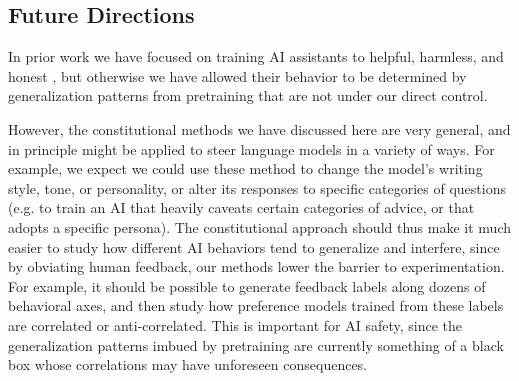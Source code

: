\documentclass[english]{article}
\renewcommand\>{\rangle}
\begin{document}



\subsection{Future Directions}


In prior work we have focused on training AI assistants to helpful, harmless, and honest \cite{askell2021general}, but otherwise we have allowed their behavior to be determined by generalization patterns  from pretraining that are not under our direct control.

However, the constitutional methods we have discussed here are very general, and in principle might be applied to steer language models in a variety of ways. For example,  we expect we could use these method to change the model's writing style, tone, or personality, or alter its responses to specific categories of questions (e.g. to train an AI that heavily caveats certain categories of advice, or that adopts a specific persona).  The constitutional approach should thus make it much easier to study how different AI behaviors tend to generalize and interfere, since by obviating human feedback, our methods lower the barrier to experimentation.  For example, it should be possible to generate feedback labels along dozens of behavioral  axes, and then study how preference models trained from these labels are correlated or anti-correlated. This is important for AI safety, since the generalization patterns imbued by pretraining are currently something of a black box whose correlations may have unforeseen consequences. 
\end{document}
